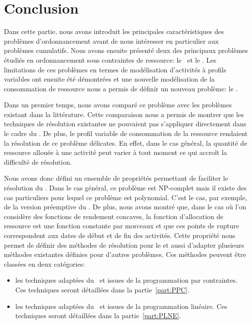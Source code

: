 
\chapter*{Conclusion}

Dans cette partie, nous avons introduit les principales
caractéristiques des problèmes d'ordonnancement avant de nous
intéresser en particulier aux problèmes cumulatifs. Nous avons ensuite
présenté deux des principaux problèmes étudiés en ordonnancement sous
contraintes de ressource: le \RCPSP~et le \CUSP. Les limitations de
ces problèmes en termes de modélisation d'activités à profils
variables ont ensuite été démontrées et une nouvelle modélisation de
la consommation de ressource nous a permis de définir un nouveau
problème: le \CECSP. 

Dans un premier temps, nous avons comparé ce problème avec les
problèmes existant dans la littérature. Cette comparaison nous a
permis de montrer que les techniques de résolution existantes ne
pouvaient pas s'appliquer directement dans le cadre du \CECSP. De
plus, le profil variable de consommation de la ressource rendaient la
résolution de ce problème délicates. En effet, dans le cas général, la
quantité de ressource allouée à une activité peut varier à tout
moment ce qui accroît la difficulté de résolution. 

Nous avons donc défini un ensemble de propriétés permettant de
faciliter le résolution du \CECSP. Dans le cas général, ce problème
est NP-complet mais il existe des cas particuliers pour lequel ce
problème est polynomial. C'est le cas, par exemple, de la version
préemptive du \CECSP. De plus, nous avons montré que, dans le cas où
l'on considère des fonctions de rendement concaves, la fonction
d'allocation de ressource est une fonction constante par morceaux et
que ces points de rupture correspondent aux dates de début et de fin
des activités. Cette propriété nous permet de définir des méthodes de
résolution pour le \CECSP et aussi d'adapter plusieurs méthodes
existantes définies pour d'autres problèmes. Ces méthodes peuvent être
classées en deux catégories: 
\begin{itemize}
\item les techniques adaptées du \CUSP~et issues de la programmation
  par contraintes. Ces techniques seront détaillées dans la
  partie~\ref{part:PPC}.
\item les techniques adaptées du \RCPSP~et issues de la programmation
  linéaire. Ces techniques seront détaillées dans la
  partie~\ref{part:PLNE}.
\end{itemize}
